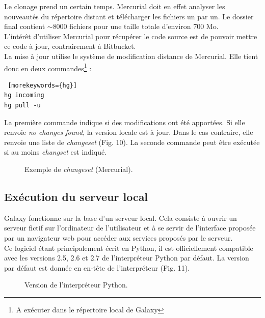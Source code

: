 Le clonage prend un certain temps. Mercurial doit en effet analyser les nouveautés du répertoire distant et télécharger les fichiers un par un. Le dossier final contient $\sim$8000 fichiers pour une taille totale d'environ 700 Mo.\\

L'intérêt d'utiliser Mercurial pour récupérer le code source est de pouvoir mettre ce code à jour, contrairement à Bitbucket.\\
La mise à jour utilise le système de modification distance de Mercurial. Elle tient donc en deux commandes\footnote{A exécuter dans le répertoire local de Galaxy} : 
\lstset{language=sh}
\begin{lstlisting} [morekeywords={hg}]
hg incoming
hg pull -u
 \end{lstlisting} 
 La première commande indique si des modifications ont été apportées. Si elle renvoie \textit{no changes found}, la version locale est à jour. Dans le cas contraire, elle renvoie une liste de \textit{changeset} (Fig. 10). La seconde commande peut être exécutée si au moins \textit{changset} est indiqué.

\begin{figure}[!h]
 \centering

\caption{Exemple de \textit{changeset} (Mercurial).}
\end{figure}

\subsection{Exécution du serveur local}

Galaxy fonctionne sur la base d'un serveur local. Cela consiste à ouvrir un serveur fictif sur l'ordinateur de l'utilisateur et à se servir de l'interface proposée par un navigateur web pour accéder aux services proposés par le serveur.\\

Ce logiciel étant principalement écrit en Python, il est officiellement compatible avec les versions 2.5, 2.6 et 2.7 de l'interpréteur Python par défaut. La version par défaut est donnée en en-tête de l'interpréteur  
(Fig. 11).

 \begin{figure}[!h]
 \centering
{}
\caption{Version de l'interpréteur Python.}
\end{figure}


